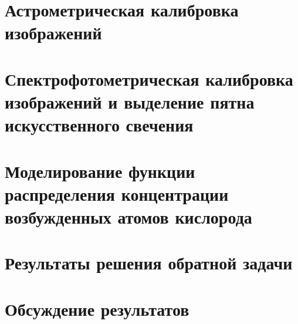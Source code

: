 \documentclass[12pt,a4paper]{article}
\begin{document}
\section{Астрометрическая калибровка изображений} \label{sec:astro_cal}

\section{Спектрофотометрическая калибровка изображений и выделение пятна искусственного свечения} \label{sec:spectro_cal}

\section{Моделирование функции распределения концентрации возбужденных атомов кислорода} \label{sec:modelling}

\section{Результаты решения обратной задачи} \label{sec:inv_problem_results}

\section{Обсуждение результатов} \label{sec:discuss}



\end{document}
